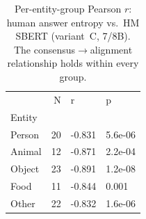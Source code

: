 \begin{table}[t]
\centering
\caption{Per-entity-group Pearson $r$: human answer entropy vs.\ HM SBERT (variant~C, 7/8B). The consensus$\to$alignment relationship holds within every group.}
\label{tab:entropy_sbert_entity}
\small
\begin{tabular}{lrll}
\toprule
 & N & r & p \\
Entity &  &  &  \\
\midrule
Person & 20 & -0.831 & 5.6e-06 \\
Animal & 12 & -0.871 & 2.2e-04 \\
Object & 23 & -0.891 & 1.2e-08 \\
Food & 11 & -0.844 & 0.001 \\
Other & 22 & -0.832 & 1.6e-06 \\
\bottomrule
\end{tabular}
\end{table}

